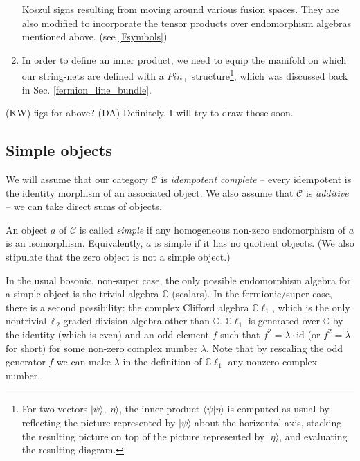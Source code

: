 \documentclass[12pt,a4paper]{article}
\newcommand{\cc}{\mathbb{C}}
\newcommand{\mcc}{\mathcal{C}}
\newcommand{\zt}{\mathbb{Z}_2}
\newcommand{\id}{\text{id}}
\newcommand{\End}{\text{End}}
\newcommand{\cl}{\mathbb{C}\ell}
\newcommand{\dave}[1]{{\color{ao(english)}\footnotesize{(DA) #1}}}
\newcommand{\kw}[1]{{\color{kwcolor}\footnotesize{(KW) #1}}}
\begin{document}
\begin{enumerate}
	 Koszul signs resulting from moving around various fusion spaces. 
	 They are also modified to incorporate the tensor products over endomorphism algebras mentioned above. (see \ref{Fsymbols})
	\item In order to define an inner product, we need to equip the manifold on which our string-nets are defined with a $Pin_\pm$ structure\footnote{For two vectors $|\psi\rangle,|\eta\rangle$, the inner product $\langle \psi | \eta \rangle$ is computed as usual by reflecting the picture represented by $|\psi\rangle$ about the horizontal axis, stacking the resulting picture on top of the picture represented by $|\eta\rangle$, and evaluating the resulting diagram.}, which was discussed back in Sec. \ref{fermion_line_bundle}.
\end{enumerate}

\kw{figs for above? \dave{Definitely. I will try to draw those soon.}}


\subsection{Simple objects}  \label{def_sob_ss}

We will assume that our category $\mcc$ is {\it idempotent complete} -- 
every idempotent is the identity morphism of an associated object.
We also assume that $\mcc$ is {\it additive} -- we can take direct sums of objects.

An object $a$ of $\mcc$ is called {\it simple} if any homogeneous non-zero endomorphism of $a$ is an isomorphism.
Equivalently, $a$ is simple if it has no quotient objects.
(We also stipulate that the zero object is not a simple object.)

In the usual bosonic, non-super case, the only possible endomorphism algebra for a simple object
is the trivial algebra $\cc$ (scalars).
In the fermionic/super case, there is a second possibility: the complex Clifford algebra $\cl_1$, 
which is the only nontrivial $\zt$-graded division algebra other than $\cc$.
$\cl_1$ is generated over $\cc$ by the identity (which is even) and an odd element $f$ such that $f^2 = \lambda \cdot \id$
(or $f^2 = \lambda$ for short) for some non-zero complex number $\lambda$. 
Note that by rescaling the odd generator $f$ we can make $\lambda$ in the definition of $\cl_1$ any nonzero complex number. 
\end{document}
